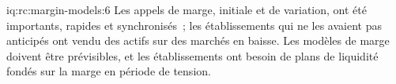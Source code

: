 \begin{solution}{iq:rc:margin-models:6}
Les appels de marge, initiale et de variation, ont été importants, rapides et synchronisés~; les établissements qui ne les avaient pas anticipés
ont vendu des actifs sur des marchés en baisse. Les modèles de marge doivent être prévisibles, et les établissements ont besoin de plans de liquidité
fondés sur la marge en période de tension.
\end{solution}
